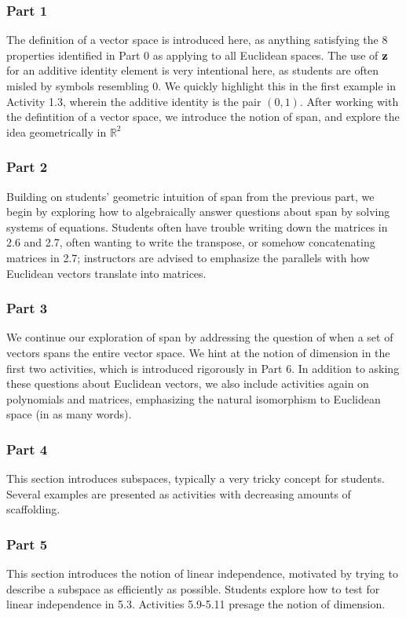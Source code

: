 \documentclass{article}
\begin{document}
\subsubsection*{Part 1}
The definition of a vector space is introduced here, as anything satisfying the 8 properties identified in Part 0 as applying to all Euclidean spaces.  The use of $\bf{z}$ for an additive identity element is very intentional here, as students are often misled by symbols resembling $0$.  We quickly highlight this in the first example in Activity 1.3, wherein the additive identity is the pair $(0,1)$.  After working with the defintition of a vector space, we introduce the notion of span, and explore the idea geometrically in $\mathbb{R}^2$

\subsubsection*{Part 2}
Building on students' geometric intuition of span from the previous part, we begin by exploring how to algebraically answer questions about span by solving systems of equations.  Students often have trouble writing down the matrices in 2.6 and 2.7, often wanting to write the transpose, or somehow concatenating matrices in 2.7; instructors are advised to emphasize the parallels with how Euclidean vectors translate into matrices.

\subsubsection*{Part 3}
We continue our exploration of span by addressing the question of when a set of vectors spans the entire vector space.  We hint at the notion of dimension in the first two activities, which is introduced rigorously in Part 6.  In addition to asking these questions about Euclidean vectors, we also include activities again on polynomials and matrices, emphasizing the natural isomorphism to Euclidean space (in as many words).  

\subsubsection*{Part 4}
This section introduces subspaces, typically a very tricky concept for students.  Several examples are presented as activities with decreasing amounts of scaffolding.

\subsubsection*{Part 5}
This section introduces the notion of linear independence, motivated by trying to describe a subspace as efficiently as possible.  Students explore how to test for linear independence in 5.3.  Activities 5.9-5.11 presage the notion of dimension.  
\end{document}
